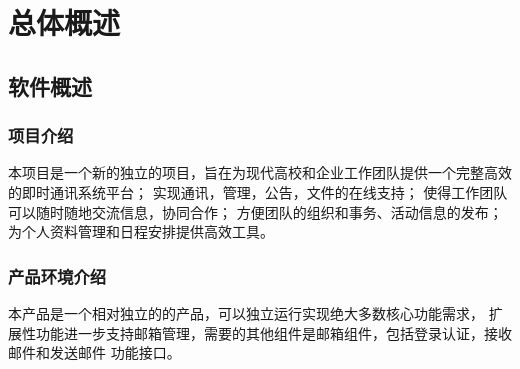 \chapter{总体概述}
\section{软件概述}

	\subsection{项目介绍}
	本项目是一个新的独立的项目，旨在为现代高校和企业工作团队提供一个完整高效的即时通讯系统平台；
	实现通讯，管理，公告，文件的在线支持；
	使得工作团队可以随时随地交流信息，协同合作；
	方便团队的组织和事务、活动信息的发布；
	为个人资料管理和日程安排提供高效工具。

	\subsection{产品环境介绍}
	本产品是一个相对独立的的产品，可以独立运行实现绝大多数核心功能需求，
	扩展性功能进一步支持邮箱管理，需要的其他组件是邮箱组件，包括登录认证，接收邮件和发送邮件
	功能接口。

